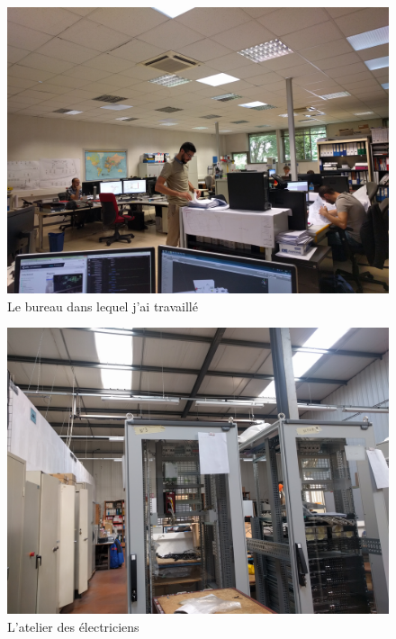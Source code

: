 \documentclass[a4paper]{article}
\begin{document}
    \begin{figure}[H]
        \centering
        \includegraphics[scale=0.05]{img/bureauEtude}
        \caption{Le bureau dans lequel j'ai travaillé}
    \end{figure}
    \vfill
    \begin{figure}[H]
        \centering
        \includegraphics[scale=0.05]{img/atelier}
        \caption{L'atelier des électriciens}
    \end{figure}
    \vfill
\end{document}
